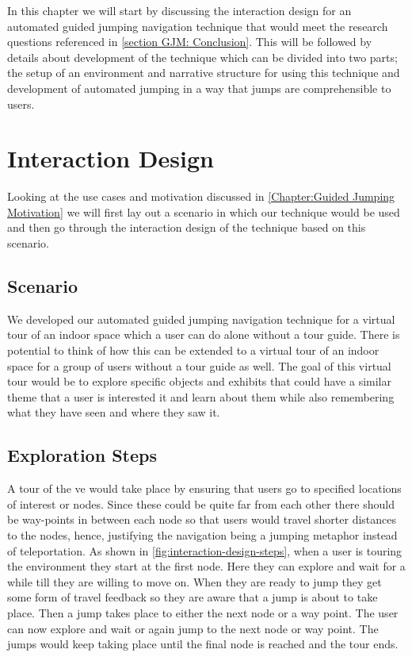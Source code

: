 \label{Chapter:Automated Guided Jumping}
In this chapter we will start by discussing the interaction design for an automated guided jumping navigation technique that would meet the research questions referenced in \cref{section GJM: Conclusion}. This will be followed by details about development of the technique which can be divided into two parts; the setup of an environment and narrative structure for using this technique and development of automated jumping in a way that jumps are comprehensible to users. 

\section{Interaction Design}
\label{section AGJ: Interaction Design}
Looking at the use cases and motivation discussed in \cref{Chapter:Guided Jumping Motivation} we will first lay out a scenario in which our technique would be used and then go through the interaction design of the technique based on this scenario.

\subsection{Scenario}
\label{subsection AGJ ID: Scenario}
We developed our automated guided jumping navigation technique  for a virtual tour of an indoor space which a user can do alone without a tour guide. There is potential to think of how this can be extended to a virtual tour of an indoor space for a group of users without a tour guide as well. The goal of this virtual tour would be to explore specific objects and exhibits that could have a similar theme that a user is interested it and learn about them while also remembering what they have seen and where they saw it. 

\subsection{Exploration Steps}
\label{subsection AGJ ID: Exploration Steps}
A tour of the \acrshort{ve} would take place by ensuring that users go to specified locations of interest or nodes. Since these could be quite far from each other there should be way-points in between each node so that users would travel shorter distances to the nodes, hence, justifying the navigation being a jumping metaphor instead of teleportation. As shown in \cref{fig:interaction-design-steps}, when a user is touring the environment they start at the first node. Here they can explore and wait for a while till they are willing to move on. When they are ready to jump they get some form of travel feedback so they are aware that a jump is about to take place. Then a jump takes place to either the next node or a way point. The user can now explore and wait or again jump to the next node or way point. The jumps would keep taking place until the final node is reached and the tour ends. 

